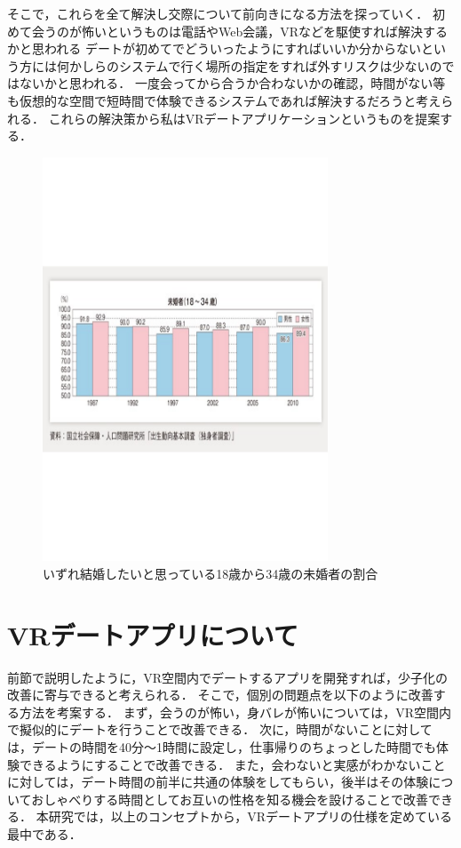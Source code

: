 \documentclass[12pt]{ltjsarticle}
\begin{document}
そこで，これらを全て解決し交際について前向きになる方法を探っていく．
初めて会うのが怖いというものは電話やWeb会議，VRなどを駆使すれば解決するかと思われる
デートが初めてでどういったようにすればいいか分からないという方には何かしらのシステムで行く場所の指定をすれば外すリスクは少ないのではないかと思われる．
一度会ってから合うか合わないかの確認，時間がない\cite{chou2014}等も仮想的な空間で短時間で体験できるシステムであれば解決するだろうと考えられる．
これらの解決策から私はVRデートアプリケーションというものを提案する．
\begin{figure}[h]
\begin{center}
 \includegraphics[width=85mm]{fig1.pdf}
\end{center}
 \caption{いずれ結婚したいと思っている18歳から34歳の未婚者の割合}
 \label{fig:教科書}
\end{figure}

\section{VRデートアプリについて}
前節で説明したように，VR空間内でデートするアプリを開発すれば，少子化の改善に寄与できると考えられる．
そこで，個別の問題点を以下のように改善する方法を考案する．
まず，会うのが怖い，身バレが怖いについては，VR空間内で擬似的にデートを行うことで改善できる．
次に，時間がないことに対しては，デートの時間を40分〜1時間に設定し，仕事帰りのちょっとした時間でも体験できるようにすることで改善できる．
また，会わないと実感がわかないことに対しては，デート時間の前半に共通の体験をしてもらい，後半はその体験についておしゃべりする時間としてお互いの性格を知る機会を設けることで改善できる．
本研究では，以上のコンセプトから，VRデートアプリの仕様を定めている最中である．
\end{document}
